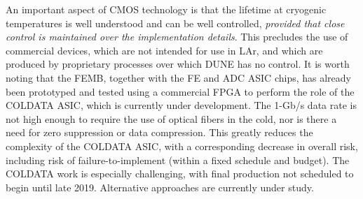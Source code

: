 An important aspect of CMOS technology is that the lifetime at cryogenic temperatures is well understood and can be
well controlled, {\em provided that close control is maintained over the implementation details}.
This precludes the use of commercial devices, which are not intended for use in LAr,
and which are produced by proprietary processes over which DUNE has no control.
It is worth noting that the FEMB, together with the FE and ADC ASIC chips, has already been prototyped and tested 
using a commercial FPGA to perform the role of the COLDATA ASIC,
which is currently under development.
The 1-Gb/s data rate is not high enough to require the use of optical fibers in the cold,
nor is there a need for zero suppression or data compression.
This greatly reduces the complexity of the COLDATA ASIC, with a corresponding decrease in overall risk,
including risk of failure-to-implement (within a fixed schedule and budget).
The COLDATA work is especially challenging, with final production not scheduled to begin until late 2019.
Alternative approaches are currently under study.

